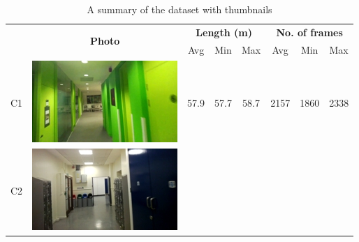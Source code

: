 \begin{table}[ht]
\caption{A summary of the dataset with thumbnails}
\label{tbl:Datasets}

\begin{center}

\centering
    \begin{tabular}{l c c c c c c c}
    \hline
    & \multirow{2}{*}{\bf{Photo}} & \multicolumn{3}{c}{\bf{Length (m)}} & \multicolumn{3}{c}{\bf{No. of frames}}  \\ \cline{3-8}
             & ~     & Avg    & Min   & Max   & Avg              & Min  & Max  \\ \hline
    C1       & \begin{minipage}{.2\textwidth}
      			\includegraphics[width=\linewidth]{./gfx/Chapter04/table/1.jpg}
			   \end{minipage}
			        & 57.9  & 57.7 & 58.7 & 2157         & 1860 & 2338 \\ \hline
    C2       & \begin{minipage}{.2\textwidth}
      			\includegraphics[width=\linewidth]{./gfx/Chapter04/table/2.jpg}
			   \end{minipage}

\end{tabular}
\end{center}
\end{table}
